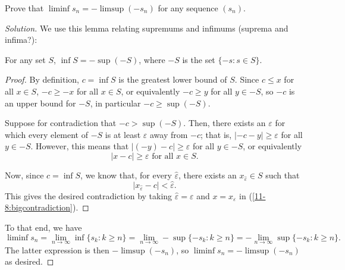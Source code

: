 \documentclass[11pt]{scrartcl}
\providecommand{\eps}{\varepsilon}
\theoremstyle{problem}
\newenvironment{problem}[1]
{\renewcommand\theinnercustomthm{#1}\innercustomthm}
{\endinnercustomthm}
\theoremstyle{remark}
\newenvironment{soln}{\begin{proof}[Solution]}{\end{proof}}
\begin{document}
\pagebreak
\begin{problem}{11.8}
	Prove that $\liminf s_n = -\limsup (-s_n)$ for any sequence $(s_n)$.
\end{problem}
\begin{soln}
	We use this lemma relating supremums and infimums
	(suprema and infima?):
	\begin{lemma*}
		For any set $S$, $\inf S = -\sup (-S)$, where $-S$ is the set
		$\{-s : s\in S\}$.
	\end{lemma*}
	\begin{proof}
		By definition, $c = \inf S$ is the greatest lower bound of $S$.
		Since $c \le x$ for all $x\in S$, $-c \ge -x$ for all $x\in S$,
		or equivalently $-c \ge y$ for all $y\in -S$, so $-c$ is an upper bound
		for $-S$, in particular $-c\ge \sup(-S)$.
		
		Suppose for contradiction that $-c > \sup(-S)$.
		Then, there exists an $\eps$ for which
		every element of $-S$ is at least $\eps$ away from $-c$;
		that is, $|-c - y| \ge \eps$ for all $y\in -S$.
		However, this means that $|(-y) - c| \ge \eps$ for all $y\in -S$,
		or equivalently
		\begin{equation}\label{11-8:bigcontradiction}
			|x - c| \ge \eps \text{ for all } x\in S.
		\end{equation}
		
		Now, since $c = \inf S$, we know that, for every $\hat\eps$,
		there exists an $x_{\hat\eps}\in S$ such that
		\[|x_{\hat\eps} - c| < \hat\eps.\]
		This gives the desired contradiction by taking $\hat\eps = \eps$
		and $x = x_\eps$ in (\ref{11-8:bigcontradiction}).
	\end{proof}

	To that end, we have
	\[\liminf s_n = \lim_{n\to\infty} \inf\{s_k : k\ge n\}
	= \lim_{n\to\infty} -\sup\{-s_k : k\ge n\}
	= -\lim_{n\to\infty} \sup\{-s_k : k\ge n\}.\]
	The latter expression is then $-\limsup (-s_n)$,
	so $\liminf s_n = -\limsup (-s_n)$ as desired. 
\end{soln}
\end{document}
